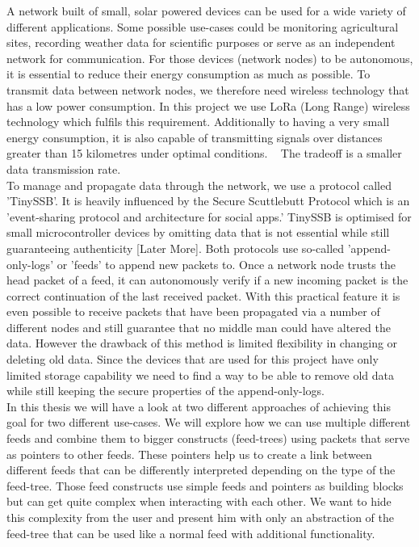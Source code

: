 A network built of small, solar powered devices can be used for a wide variety of different applications. Some possible use-cases could be monitoring agricultural sites, recording weather data for scientific purposes or serve as an independent network for communication. For those devices (network nodes) to be autonomous, it is essential to reduce their energy consumption as much as possible. To transmit data between network nodes, we therefore need wireless technology that has a low power consumption. In this project we use LoRa (Long Range) wireless technology which fulfils this requirement. Additionally to having a very small energy consumption, it is also capable of transmitting signals over distances greater than 15 kilometres under optimal conditions. ~\cite{10.1007/978-3-030-01168-0_11} The tradeoff is a smaller data transmission rate. \\
To manage and propagate data through the network, we use a protocol called 'TinySSB'. It is heavily influenced by the Secure Scuttlebutt Protocol which is an 'event-sharing protocol and architecture for social apps.' \cite{10.1145/3357150.3357396} TinySSB is optimised for small microcontroller devices by omitting data that is not essential while still guaranteeing authenticity [Later More]. Both protocols use so-called 'append-only-logs' or 'feeds' to append new packets to. Once a network node trusts the head packet of a feed, it can autonomously verify if a new incoming packet is the correct continuation of the last received packet. With this practical feature it is even possible to receive packets that have been propagated via a number of different nodes and still guarantee that no middle man could have altered the data. However the drawback of this method is limited flexibility in changing or deleting old data. Since the devices that are used for this project have only limited storage capability we need to find a way to be able to remove old data while still keeping the secure properties of the append-only-logs. \\
In this thesis we will have a look at two different approaches of achieving this goal for two different use-cases. We will explore how we can use multiple different feeds and combine them to bigger constructs (feed-trees) using packets that serve as pointers to other feeds. These pointers help us to create a link between different feeds that can be differently interpreted depending on the type of the feed-tree. Those feed constructs use simple feeds and pointers as building blocks but can get quite complex when interacting with each other. We want to hide this complexity from the user and present him with only an abstraction of the feed-tree that can be used like a normal feed with additional functionality. \\
